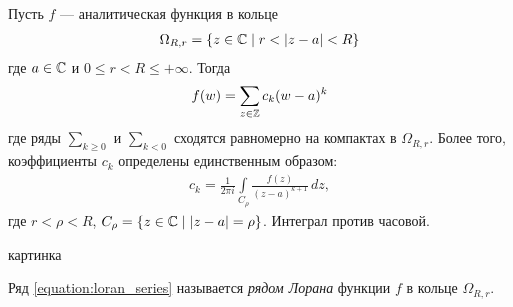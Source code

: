 \documentclass[../../main.tex]{subfiles}
\begin{document}
\begin{thm}
 Пусть $ f $ --- аналитическая функция в кольце
 \begin{align*}
  \Omega_{R,r} = \left\{ z \in \mathbb{C} \mid r < \left| z - a \right| < R \right\}
 \end{align*} где $ a \in \mathbb{C} $ и $ 0 \leqslant r < R \leqslant +\infty $. Тогда
 \begin{align}
  \label{equation:loran_series}
  f(w) = \sum_{z \in \mathbb{Z}} c_k(w - a)^{k}
 \end{align} где ряды $ \sum_{k \geqslant 0} $ и $ \sum_{k < 0} $ сходятся равномерно на компактах в $ \Omega_{R,r} $. Более того, коэффициенты $ c_k $ определены единственным образом:
 \begin{align*}
  c_k = \frac{1}{2\pi i} \int\limits_{C_\rho}   \frac{f(z)}{(z-a)^{k+1}}\,dz,
 \end{align*} где $ r < \rho < R $, $ C_\rho = \left\{ z \in \mathbb{C} \mid \left| z-a \right|=\rho \right\} $. Интеграл против часовой.
\end{thm}
{\color{red} картинка}
\begin{df}
 Ряд \eqref{equation:loran_series} называется \textit{рядом Лорана} функции $ f $ в кольце $ \Omega_{R,r} $.
\end{df}
\end{document}
